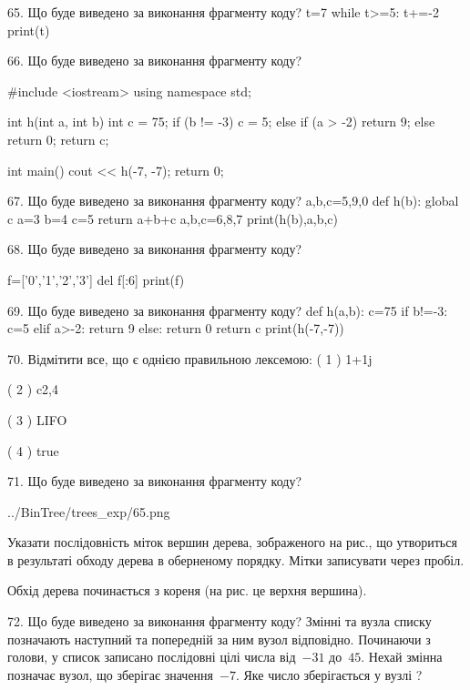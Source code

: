 \documentclass[11pt]{article}
\begin{document}
65. Що буде виведено за виконання фрагменту коду?
t=7
   while t>=5: t+=-2
   print(t)

66. Що буде виведено за виконання фрагменту коду?

#include <iostream>
using namespace std;

int h(int a, int b){
    int c = 75;
    if (b != -3)
        c = 5;
    else if (a > -2)
         return 9;
    else 
        return 0;
    return c;
}

int main(){
    cout << h(-7, -7);
    return 0;
}


67. Що буде виведено за виконання фрагменту коду?
a,b,c=5,9,0
   def h(b):
     global c     a=3
     b=4
     c=5
     return a+b+c
   a,b,c=6,8,7
   print(h(b),a,b,c)

68. Що буде виведено за виконання фрагменту коду?

f=['0','1','2','3']
del f[:6]
print(f)



69. Що буде виведено за виконання фрагменту коду?
def h(a,b):
      c=75
      if b!=-3: c=5
      elif a>-2: return 9
      else: return 0
      return c
   print(h(-7,-7))

70. %
Відмітити все, що є однією правильною лексемою:
( 1 ) 1+1j

( 2 ) c2,4

( 3 ) LIFO

( 4 ) true


71. Що буде виведено за виконання фрагменту коду?

\begin{center}
	{../BinTree/trees_exp/65.png}
\end{center}
Указати послідовність міток вершин дерева, зображеного на рис., що утвориться в результаті обходу дерева в оберненому порядку. Мітки записувати через пробіл.\par Обхід дерева починається з кореня (на рис. це верхня вершина).


72. Що буде виведено за виконання фрагменту коду?
Змінні  та  вузла списку позначають наступний та попередній за ним вузол відповідно. Починаючи з голови, у список записано послідовні цілі числа від~$-31$ до~$45$. Нехай змінна  позначає вузол, що зберігає значення~$-7$.
Яке число зберігається у вузлі  ?
\end{document}

